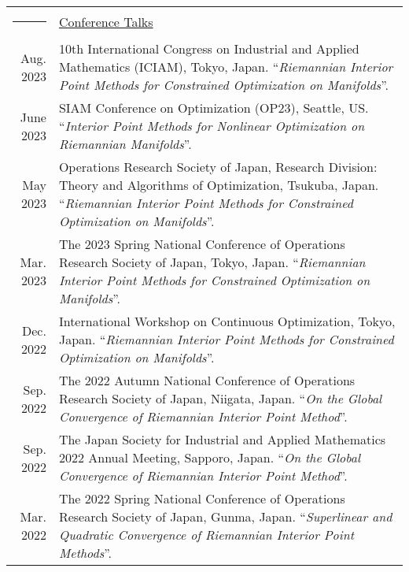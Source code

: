 \documentclass[a4paper,10pt]{article}
\newcommand{\headingfont}{\LARGE \MakeUppercase }
\newenvironment{SectionTable}[1]{
	\renewcommand*{\arraystretch}{1.0}
	\setlength{\tabcolsep}{10pt}
	\begin{longtable}{Rp{5.2in}} 
		\rule{2.3cm}{4pt} 
		& \underline{#1} \\ %
	}
	{
	\end{longtable}\vspace{-.3cm}
}
\begin{document}
\begin{SectionTable}{\headingfont Conference Talks}
	Aug. 2023 & 10th International Congress on Industrial and Applied Mathematics (ICIAM), Tokyo, Japan.  \newline ``\textit{Riemannian Interior Point Methods for Constrained Optimization on Manifolds}''. \\
	
	June 2023 & SIAM Conference on Optimization (OP23), Seattle, US.  
	 \newline ``\textit{Interior Point Methods for Nonlinear Optimization on Riemannian Manifolds}''. \\
	
	May 2023 & Operations Research Society of Japan, Research Division: Theory and Algorithms of Optimization, Tsukuba, Japan.  
	 \newline ``\textit{Riemannian Interior Point Methods for Constrained Optimization on Manifolds}''. \\
	
	Mar. 2023 & The 2023 Spring National Conference of Operations Research Society of Japan, Tokyo, Japan.  
	 \newline ``\textit{Riemannian Interior Point Methods for Constrained Optimization on Manifolds}''. \\
	
	Dec. 2022 & International Workshop on Continuous Optimization, Tokyo, Japan.  
	 \newline ``\textit{Riemannian Interior Point Methods for Constrained Optimization on Manifolds}''. \\
	
	Sep. 2022 & The 2022 Autumn National Conference of Operations Research Society of Japan, Niigata, Japan. 
	 \newline ``\textit{On the Global Convergence of Riemannian Interior Point Method}''.\\
	
	Sep. 2022 & The Japan Society for Industrial and Applied Mathematics 2022 Annual Meeting, Sapporo, Japan. 
	 \newline ``\textit{On the Global Convergence of Riemannian Interior Point Method}''.\\
	
	Mar. 2022 & The 2022 Spring National Conference of Operations Research Society of Japan, Gunma, Japan.
	 \newline ``\textit{Superlinear and Quadratic Convergence of Riemannian Interior Point Methods}''. \\
	

\end{SectionTable}
\end{document}
